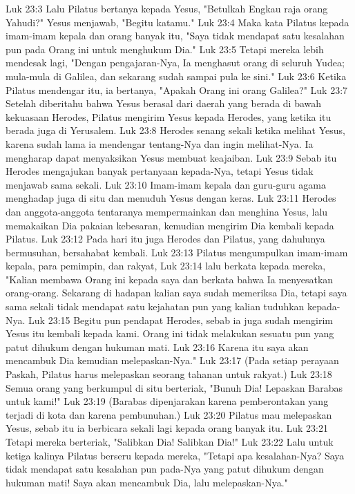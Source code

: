 Luk 23:3  Lalu Pilatus bertanya kepada Yesus, "Betulkah Engkau raja orang Yahudi?" Yesus menjawab, "Begitu katamu."
Luk 23:4  Maka kata Pilatus kepada imam-imam kepala dan orang banyak itu, "Saya tidak mendapat satu kesalahan pun pada Orang ini untuk menghukum Dia."
Luk 23:5  Tetapi mereka lebih mendesak lagi, "Dengan pengajaran-Nya, Ia menghasut orang di seluruh Yudea; mula-mula di Galilea, dan sekarang sudah sampai pula ke sini."
Luk 23:6  Ketika Pilatus mendengar itu, ia bertanya, "Apakah Orang ini orang Galilea?"
Luk 23:7  Setelah diberitahu bahwa Yesus berasal dari daerah yang berada di bawah kekuasaan Herodes, Pilatus mengirim Yesus kepada Herodes, yang ketika itu berada juga di Yerusalem.
Luk 23:8  Herodes senang sekali ketika melihat Yesus, karena sudah lama ia mendengar tentang-Nya dan ingin melihat-Nya. Ia mengharap dapat menyaksikan Yesus membuat keajaiban.
Luk 23:9  Sebab itu Herodes mengajukan banyak pertanyaan kepada-Nya, tetapi Yesus tidak menjawab sama sekali.
Luk 23:10  Imam-imam kepala dan guru-guru agama menghadap juga di situ dan menuduh Yesus dengan keras.
Luk 23:11  Herodes dan anggota-anggota tentaranya mempermainkan dan menghina Yesus, lalu memakaikan Dia pakaian kebesaran, kemudian mengirim Dia kembali kepada Pilatus.
Luk 23:12  Pada hari itu juga Herodes dan Pilatus, yang dahulunya bermusuhan, bersahabat kembali.
Luk 23:13  Pilatus mengumpulkan imam-imam kepala, para pemimpin, dan rakyat,
Luk 23:14  lalu berkata kepada mereka, "Kalian membawa Orang ini kepada saya dan berkata bahwa Ia menyesatkan orang-orang. Sekarang di hadapan kalian saya sudah memeriksa Dia, tetapi saya sama sekali tidak mendapat satu kejahatan pun yang kalian tuduhkan kepada-Nya.
Luk 23:15  Begitu pun pendapat Herodes, sebab ia juga sudah mengirim Yesus itu kembali kepada kami. Orang ini tidak melakukan sesuatu pun yang patut dihukum dengan hukuman mati.
Luk 23:16  Karena itu saya akan mencambuk Dia kemudian melepaskan-Nya."
Luk 23:17  (Pada setiap perayaan Paskah, Pilatus harus melepaskan seorang tahanan untuk rakyat.)
Luk 23:18  Semua orang yang berkumpul di situ berteriak, "Bunuh Dia! Lepaskan Barabas untuk kami!"
Luk 23:19  (Barabas dipenjarakan karena pemberontakan yang terjadi di kota dan karena pembunuhan.)
Luk 23:20  Pilatus mau melepaskan Yesus, sebab itu ia berbicara sekali lagi kepada orang banyak itu.
Luk 23:21  Tetapi mereka berteriak, "Salibkan Dia! Salibkan Dia!"
Luk 23:22  Lalu untuk ketiga kalinya Pilatus berseru kepada mereka, "Tetapi apa kesalahan-Nya? Saya tidak mendapat satu kesalahan pun pada-Nya yang patut dihukum dengan hukuman mati! Saya akan mencambuk Dia, lalu melepaskan-Nya."
